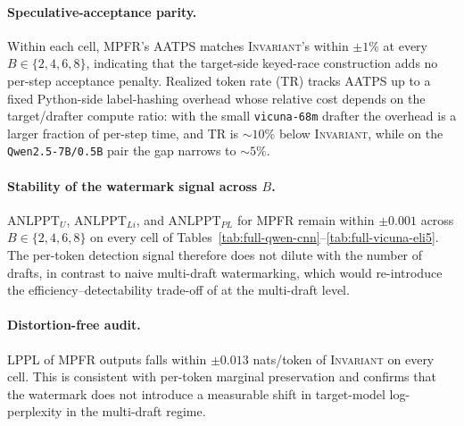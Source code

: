 \paragraph{Speculative-acceptance parity.}
Within each cell, \textsc{MPFR}'s AATPS matches \textsc{Invariant}'s
within $\pm 1\%$ at every $B \in \{2,4,6,8\}$, indicating that the
target-side keyed-race construction adds no per-step acceptance
penalty.  Realized token rate (TR) tracks AATPS up to a fixed
Python-side label-hashing overhead whose relative cost depends on the
target/drafter compute ratio: with the small \texttt{vicuna-68m}
drafter the overhead is a larger fraction of per-step time, and TR is
$\sim\!10\%$ below \textsc{Invariant}, while on the
\texttt{Qwen2.5-7B/0.5B} pair the gap narrows to $\sim\!5\%$.

\paragraph{Stability of the watermark signal across $B$.}
$\mathrm{ANLPPT}_U$, $\mathrm{ANLPPT}_{Li}$, and $\mathrm{ANLPPT}_{PL}$
for \textsc{MPFR} remain within $\pm 0.001$ across $B\in\{2,4,6,8\}$ on
every cell of Tables~\ref{tab:full-qwen-cnn}--\ref{tab:full-vicuna-eli5}.
The per-token detection signal therefore does not dilute with the
number of drafts, in contrast to naive multi-draft watermarking, which
would re-introduce the efficiency--detectability trade-off of
\citet{hu2024inevitable} at the multi-draft level.

\paragraph{Distortion-free audit.}
LPPL of \textsc{MPFR} outputs falls within $\pm 0.013$ nats/token of
\textsc{Invariant} on every cell.  This is consistent with per-token
marginal preservation and confirms that the watermark does not
introduce a measurable shift in target-model log-perplexity in the
multi-draft regime.